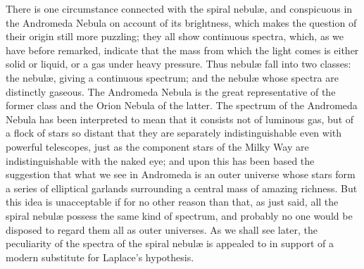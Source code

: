 There is one circumstance connected with the spiral nebul{\ae}, and
conspicuous in the Andromeda Nebula on account of its brightness,
which makes the question of their origin still more puzzling; they all
show continuous spectra, which, as we have before remarked, indicate
that the mass from which the light comes is either solid or liquid, or
a gas under heavy pressure. Thus nebul{\ae} fall into two classes: the
 nebul{\ae}, giving a continuous spectrum; and the
 nebul{\ae} whose spectra are distinctly gaseous. The
Andromeda Nebula is the great representative of the former class and
the Orion Nebula of the latter. The spectrum of the Andromeda Nebula 
has been interpreted to mean that it consists not of luminous gas, but
of a flock of stars so distant that they are separately
indistinguishable even with powerful telescopes, just as the component
stars of the Milky Way are indistinguishable with the naked eye; and
upon this has been based the suggestion that what we see in Andromeda
is an outer universe whose stars form a series of elliptical garlands
surrounding a central mass of amazing richness. But this idea is 
unacceptable if for no other reason than that, as just said, all the
spiral nebul{\ae} possess the same kind of spectrum, and probably no
one would be disposed to regard them all as outer universes. As we
shall see later, the peculiarity of the spectra of the spiral
nebul{\ae} is appealed to in support of a modern substitute for
Laplace's hypothesis. 

